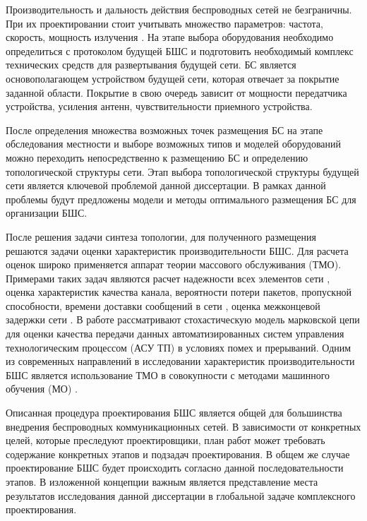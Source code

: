 Производительность и дальность действия беспроводных сетей не безграничны. При их проектировании стоит учитывать множество параметров: частота, скорость, мощность излучения \cite{Proletarsky}. На этапе выбора оборудования необходимо определиться с протоколом будущей БШС и  подготовить необходимый комплекс технических средств для развертывания будущей сети. БС является основополагающем устройством будущей сети, которая отвечает за покрытие заданной области. Покрытие в свою очередь зависит от мощности передатчика устройства, усиления антенн, чувствительности приемного устройства.


После определения множества возможных точек размещения БС на этапе обследования местности и выборе возможных типов и моделей оборудований можно переходить непосредственно к размещению БС и определению топологической структуры сети. Этап выбора топологической структуры будущей сети является ключевой проблемой данной диссертации. В рамках данной проблемы будут предложены модели и методы оптимального размещения БС для организации БШС.

После решения задачи синтеза топологии, для полученного размещения решаются задачи оценки характеристик производительности БШС. Для расчета оценок широко применяется аппарат теории массового обслуживания (ТМО). Примерами таких задач являются расчет надежности всех элементов сети \cite{Wankpo2020, Krishnamoorthy2021, Kozyrev2019}, оценка характеристик качества канала, вероятности потери пакетов, пропускной способности, времени доставки сообщений в сети \cite{Larionov2019, Vishnevsky2016_Methods_of_performance, Vishnevsky2016_Review_of_methodology, Wang2017, Sandmann2012, Baumann2017}, оценка межконцевой задержки сети \cite{Wang2017, Sandmann2012}. В работе \cite{Eremenko2013} рассматривают стохастическую модель марковской цепи для оценки качества передачи данных автоматизированных систем управления технологическим процессом (АСУ ТП) в условиях помех и прерываний. Одним из современных направлений в исследовании характеристик производительности БШС является использование ТМО в совокупности с методами машинного обучения (МО) \cite{Lovas2021, SatyaHermanto2018}.

Описанная процедура проектирования БШС является общей для большинства внедрения беспроводных коммуникационных сетей. В зависимости от конкретных целей, которые преследуют проектировщики, план работ может требовать содержание конкретных этапов и подзадач проектирования. В общем же случае проектирование БШС будет происходить согласно данной последовательности этапов. В изложенной концепции важным является представление места результатов исследования данной диссертации в глобальной задаче комплексного проектирования.


